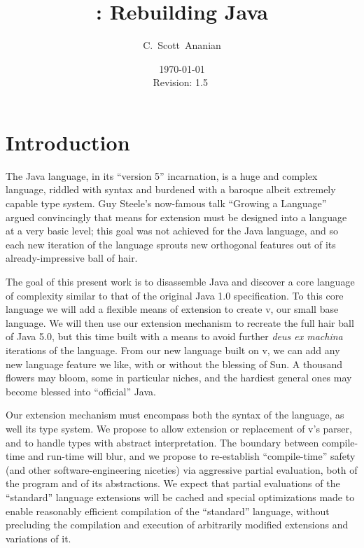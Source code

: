 \documentclass[11pt,notitlepage,twocolumn]{article}
\author{C.~Scott~Ananian}
\title{\vlang: Rebuilding Java}
\date{\today \\ $ $Revision: 1.5 $ $}
\newcommand{\vlang}{\textsf{v}\xspace}
\begin{document}

\maketitle

\section{Introduction}
The Java language, in its ``version 5'' incarnation, is a huge and
complex language, riddled with syntax and burdened with a baroque
albeit extremely capable type system.  Guy Steele's now-famous talk
``Growing a Language'' \cite{Steele99} argued convincingly that means
for extension must be designed into a language at a very basic level;
this goal was not achieved for the Java language, and so each new
iteration of the language sprouts new orthogonal features out of its
already-impressive ball of hair.

The goal of this present work is to disassemble Java and discover a
core language of complexity similar to that of the original Java
1.0 specification.  To this core language we will add a flexible means
of extension to create \vlang, our small base language.  We will then use
our extension mechanism to recreate the full hair ball of Java 5.0,
but this time built with a means to avoid further \emph{deus ex
  machina} iterations of the language.  From our new language built on
\vlang, we can add any new language feature we like, with or without the
blessing of Sun.  A thousand flowers may bloom, some in particular
niches, and the hardiest general ones may become blessed into
``official'' Java.

Our extension mechanism must encompass both the syntax of the
language, as well its type system.  We propose to allow extension or
replacement of \vlang's parser, and to handle types with abstract
interpretation.  The boundary between compile-time and run-time will
blur, and we propose to re-establish ``compile-time'' safety (and
other software-engineering niceties) via aggressive partial
evaluation, both of the program and of its abstractions.  We expect
that partial evaluations of the ``standard'' language extensions will
be cached and special optimizations made to enable reasonably
efficient compilation of the ``standard'' language, without precluding
the compilation and execution of arbitrarily modified extensions and
variations of it.
\end{document}
